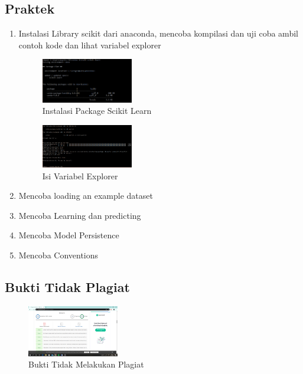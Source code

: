 \subsection{Praktek}
\begin{enumerate}
	\item Instalasi Library scikit dari anaconda, mencoba kompilasi dan uji coba ambil contoh kode dan lihat variabel explorer
	\hfill\break
	\begin{figure}[H]
		\includegraphics[width=4cm]{figures/1174074/1/Sckit-learn.png}
		\centering
		\caption{Instalasi Package Scikit Learn}
	\end{figure}
	\begin{figure}[H]
		\includegraphics[width=4cm]{figures/1174074/1/Sckit-learn2.png}
		\centering
		\caption{Isi Variabel Explorer}
	\end{figure}
	\item Mencoba loading an example dataset
	\hfill\break
	
	\item Mencoba Learning dan predicting
	\hfill\break
	
	\item Mencoba Model Persistence
	\hfill\break
	
	\item Mencoba Conventions
	\hfill\break
	
\end{enumerate}
\subsection{Bukti Tidak Plagiat}
\begin{figure}[H]
	\includegraphics[width=4cm]{figures/1174074/1/plagiarisme.png}
	\centering
	\caption{Bukti Tidak Melakukan Plagiat}
\end{figure}